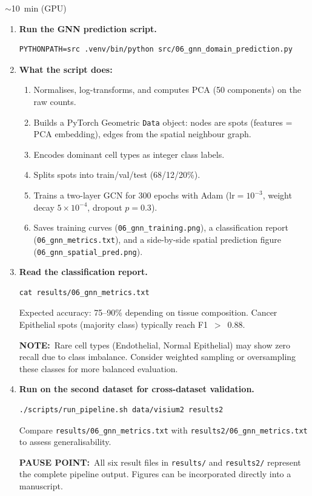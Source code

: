 \documentclass[12pt, a4paper]{article}
\newcommand{\notepar}[1]{\par\smallskip\noindent%
    {\bfseries NOTE:}\ #1\par\smallskip}
\newcommand{\pausept}[1]{\par\smallskip\noindent%
    {\bfseries PAUSE POINT:}\ #1\par\smallskip}
\newcommand{\timing}[1]{%
    \begin{tcolorbox}[colback=orange!7,colframe=orange!55!black,
        fonttitle=\bfseries\small,title=Timing,
        boxrule=0.5pt,left=4pt,right=4pt,top=2pt,bottom=2pt,
        before upper=\small]
    #1
    \end{tcolorbox}\vspace{2pt}}
\begin{document}
\timing{$\sim$10~min (GPU)}

\begin{enumerate}

\item \textbf{Run the GNN prediction script.}
\begin{lstlisting}
PYTHONPATH=src .venv/bin/python src/06_gnn_domain_prediction.py
\end{lstlisting}

\item \textbf{What the script does:}
\begin{enumerate}
    \item Normalises, log-transforms, and computes PCA (50 components)
          on the raw counts.
    \item Builds a PyTorch Geometric \texttt{Data} object: nodes are
          spots (features = PCA embedding), edges from the spatial
          neighbour graph.
    \item Encodes dominant cell types as integer class labels.
    \item Splits spots into train/val/test (68/12/20\%).
    \item Trains a two-layer GCN for 300 epochs with Adam
          ($\text{lr}=10^{-3}$, weight decay $5\times10^{-4}$,
          dropout $p=0.3$).
    \item Saves training curves (\texttt{06\_gnn\_training.png}),
          a classification report (\texttt{06\_gnn\_metrics.txt}),
          and a side-by-side spatial prediction figure
          (\texttt{06\_gnn\_spatial\_pred.png}).
\end{enumerate}

\item \textbf{Read the classification report.}
\begin{lstlisting}
cat results/06_gnn_metrics.txt
\end{lstlisting}
Expected accuracy: 75--90\% depending on tissue composition.
Cancer Epithelial spots (majority class) typically reach F1~$>$~0.88.

\notepar{Rare cell types (Endothelial, Normal Epithelial) may show
zero recall due to class imbalance.  Consider weighted sampling or
oversampling these classes for more balanced evaluation.}

\item \textbf{Run on the second dataset for cross-dataset validation.}
\begin{lstlisting}
./scripts/run_pipeline.sh data/visium2 results2
\end{lstlisting}
Compare \texttt{results/06\_gnn\_metrics.txt} with
\texttt{results2/06\_gnn\_metrics.txt} to assess generalisability.

\pausept{All six result files in \texttt{results/} and
\texttt{results2/} represent the complete pipeline output.
Figures can be incorporated directly into a manuscript.}

\end{enumerate}
\end{document}
